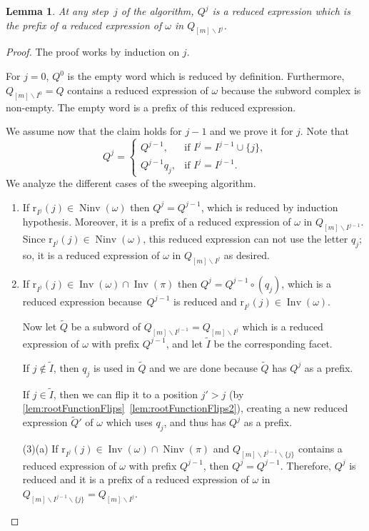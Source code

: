 \documentclass[reqno]{amsart}
\newtheorem{lemma}[theorem]{Lemma}
\theoremstyle{definition}
\newcommand{\ssm}{\smallsetminus} %
\DeclareMathOperator{\Inv}{Inv} %
\DeclareMathOperator{\Ninv}{Ninv} %
\newcommand{\rootFunction}[2]{\mathrm{r}_{#1}(#2)} %
\begin{document}
\begin{lemma}
\label{lem:sweeping2}
At any step~$j$ of the algorithm, $Q^j$ is a reduced expression which is the prefix of a reduced expression of $\omega$ in $Q_{[m]\ssm I^j}$.
\end{lemma}

\begin{proof}
The proof works by induction on $j$.

For $j=0$, $Q^0$ is the empty word which is reduced by definition.
Furthermore, $Q_{[m]\ssm I^0 }=Q$ contains a reduced expression of $\omega$ because the subword complex is non-empty.
The empty word is a prefix of this reduced expression. 

We assume now that the claim holds for $j-1$ and we prove it for $j$.
Note that 
\[
Q^j = 
\begin{cases}
Q^{j-1}, & \text{if } I^j=I^{j-1}\cup \{j\} ,\\
Q^{j-1} q_j, & \text{if } I^j=I^{j-1}.
\end{cases}
\]
We analyze the different cases of the sweeping algorithm.
\begin{enumerate}
    \item If $\rootFunction{I^j}{j}\in \Ninv(\omega)$ then 
    $Q^j=Q^{j-1}$, which is reduced by induction hypothesis.
    Moreover, it is a prefix of a reduced expression of $\omega$ in $Q_{[m]\ssm I^{j-1}}$.
    Since $\rootFunction{I^j}{j}\in \Ninv(\omega)$, this reduced expression can not use the letter $q_j$; so, it is a reduced expression of $\omega$ in $Q_{[m]\ssm I^{j}}$ as desired.
    \item If $\rootFunction{I^j}{j}\in \Inv(\omega) \cap \Inv(\pi)$ then $Q^j= Q^{j-1}\circ (q_j)$, which is a reduced expression because~$Q^{j-1}$ is reduced and $\rootFunction{I^j}{j}\in \Inv(\omega)$.
    
    Now let $\widetilde Q$ be a subword of $Q_{[m]\ssm I^{j-1}}=Q_{[m]\ssm I^{j}}$ which is a reduced expression of $\omega$ with prefix $Q^{j-1}$, and let $\widetilde I$ be the corresponding facet.
    
    If $j\notin \widetilde I$, then $q_j$ is used in $\widetilde Q$ and we are done because $\widetilde Q$ has $Q^j$ as a prefix.

    If $j\in \widetilde I$, then we can flip it to a position $j'>j$ (by \cref{lem:rootFunctionFlips}~\eqref{lem:rootFunctionFlips2}), creating a new reduced expression $\widetilde Q'$ of $\omega$ which uses $q_j$, and thus has $Q^j$ as a prefix.


    \item[(3)(a)] If $\rootFunction{I^j}{j}\in \Inv(\omega) \cap \Ninv(\pi)$ and $Q_{[m]\ssm I^{j-1}\ssm \{j\}}$ contains a reduced expression of $\omega$ with prefix $Q^{j-1}$, then $Q^j=Q^{j-1}$.
    Therefore, $Q^j$ is reduced and it is a prefix of a reduced expression of $\omega$ in 
    $Q_{[m]\ssm I^{j-1}\ssm \{j\}}=Q_{[m]\ssm I^j}$.


\end{enumerate}
\end{proof}
\end{document}
